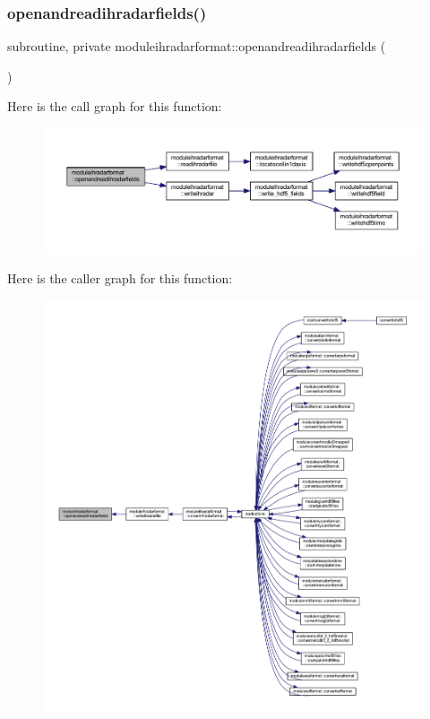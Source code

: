 \subsubsection{\texorpdfstring{openandreadihradarfields()}{openandreadihradarfields()}}
{\footnotesize\ttfamily subroutine, private moduleihradarformat\+::openandreadihradarfields (\begin{DoxyParamCaption}{ }\end{DoxyParamCaption})\hspace{0.3cm}{\ttfamily [private]}}

Here is the call graph for this function\+:\nopagebreak
\begin{figure}[H]
\begin{center}
\leavevmode
\includegraphics[width=350pt]{namespacemoduleihradarformat_a1ddc10c28e0f93952a3e8c21ab4b9e37_cgraph}
\end{center}
\end{figure}
Here is the caller graph for this function\+:\nopagebreak
\begin{figure}[H]
\begin{center}
\leavevmode
\includegraphics[width=350pt]{namespacemoduleihradarformat_a1ddc10c28e0f93952a3e8c21ab4b9e37_icgraph}
\end{center}
\end{figure}
\mbox{\label{namespacemoduleihradarformat_adb71a6554853412cfc2f930bf2a31f3a}} 
